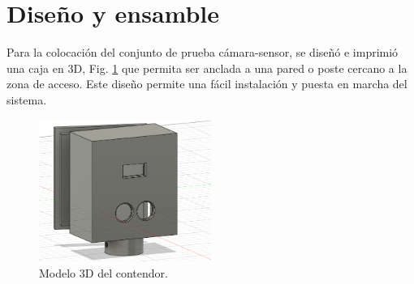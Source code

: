 \section{Diseño y ensamble}

Para la colocación del conjunto de prueba cámara-sensor, se diseñó e imprimió una caja en 3D, Fig. \ref{fig:contenedor-camara} que permita ser anclada a una pared o poste cercano a la zona de acceso. Este diseño permite una fácil instalación y puesta en marcha del sistema.
\begin{figure}[bth]
    \centering
    \includegraphics[width=0.5\textwidth]{imgs/contenedor-camara.png}
    \caption{Modelo 3D del contendor.}
    \label{fig:contenedor-camara}
\end{figure}

